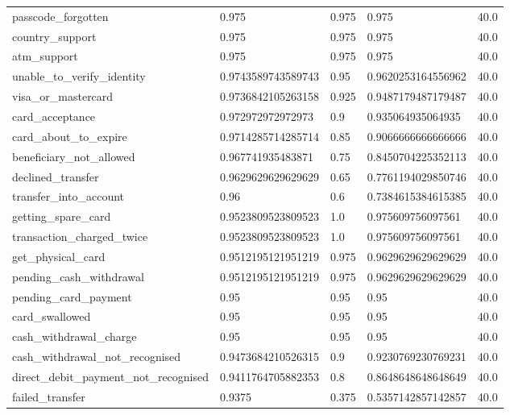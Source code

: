 \begin{table}[!ht]
\begin{tabularx}{\textwidth}{X l l l l}
passcode\_forgotten & \num{0.975} & \num{0.975} & \num{0.975} & \num{40.0} \\
country\_support & \num{0.975} & \num{0.975} & \num{0.975} & \num{40.0} \\
atm\_support & \num{0.975} & \num{0.975} & \num{0.975} & \num{40.0} \\
unable\_to\_verify\_identity & \num{0.9743589743589743} & \num{0.95} & \num{0.9620253164556962} & \num{40.0} \\
visa\_or\_mastercard & \num{0.9736842105263158} & \num{0.925} & \num{0.9487179487179487} & \num{40.0} \\
card\_acceptance & \num{0.972972972972973} & \num{0.9} & \num{0.935064935064935} & \num{40.0} \\
card\_about\_to\_expire & \num{0.9714285714285714} & \num{0.85} & \num{0.9066666666666666} & \num{40.0} \\
beneficiary\_not\_allowed & \num{0.967741935483871} & \num{0.75} & \num{0.8450704225352113} & \num{40.0} \\
declined\_transfer & \num{0.9629629629629629} & \num{0.65} & \num{0.7761194029850746} & \num{40.0} \\
transfer\_into\_account & \num{0.96} & \num{0.6} & \num{0.7384615384615385} & \num{40.0} \\
getting\_spare\_card & \num{0.9523809523809523} & \num{1.0} & \num{0.975609756097561} & \num{40.0} \\
transaction\_charged\_twice & \num{0.9523809523809523} & \num{1.0} & \num{0.975609756097561} & \num{40.0} \\
get\_physical\_card & \num{0.9512195121951219} & \num{0.975} & \num{0.9629629629629629} & \num{40.0} \\
pending\_cash\_withdrawal & \num{0.9512195121951219} & \num{0.975} & \num{0.9629629629629629} & \num{40.0} \\
pending\_card\_payment & \num{0.95} & \num{0.95} & \num{0.95} & \num{40.0} \\
card\_swallowed & \num{0.95} & \num{0.95} & \num{0.95} & \num{40.0} \\
cash\_withdrawal\_charge & \num{0.95} & \num{0.95} & \num{0.95} & \num{40.0} \\
cash\_withdrawal\_not\_recognised & \num{0.9473684210526315} & \num{0.9} & \num{0.9230769230769231} & \num{40.0} \\
direct\_debit\_payment\_not\_recognised & \num{0.9411764705882353} & \num{0.8} & \num{0.8648648648648649} & \num{40.0} \\
failed\_transfer & \num{0.9375} & \num{0.375} & \num{0.5357142857142857} & \num{40.0} \\

\end{tabularx}
\end{table}
